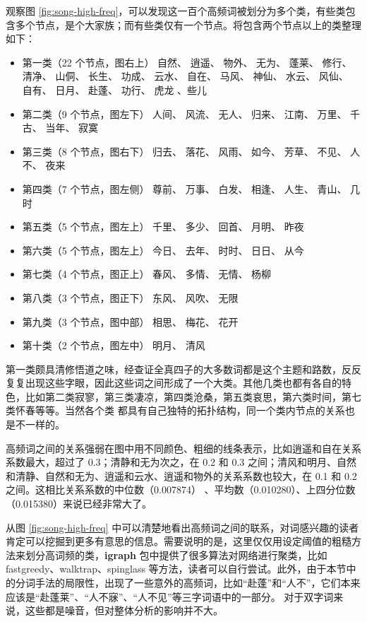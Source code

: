 \documentclass[
  b5paper,
  UTF8,twoside]{book}
\begin{document}
观察图 \ref{fig:song-high-freq}，可以发现这一百个高频词被划分为多个类，有些类包含多个节点，是个大家族；而有些类仅有一个节点。将包含两个节点以上的类整理如下：

\begin{itemize}
\item
  第一类（22 个节点，图右上） 自然、 逍遥、 物外、 无为、 蓬莱、 修行、 清净、 山侗、 长生、 功成、 云水、 自在、 马风、 神仙、 水云、 风仙、 自有、 日月、 赴蓬、 功行、 虎龙 、些儿
\item
  第二类（9 个节点，图左下） 人间、 风流、 无人、 归来、 江南、 万里、 千古、 当年、 寂寞
\item
  第三类（8 个节点，图右下） 归去、 落花、 风雨、 如今、 芳草、 不见、 人不、 夜来
\item
  第四类（7 个节点，图左侧） 尊前、 万事、 白发、 相逢、 人生、 青山、 几时
\item
  第五类（5 个节点，图左上） 千里、 多少、 回首、 月明、 昨夜
\item
  第六类（5 个节点，图左上） 今日、 去年、 时时、 日日、 从今
\item
  第七类（4 个节点，图正上） 春风、 多情、 无情、 杨柳
\item
  第八类（3 个节点，图正下） 东风、 风吹、 无限
\item
  第九类（3 个节点，图中部） 相思、 梅花、 花开
\item
  第十类（2 个节点，图左中） 明月、 清风
\end{itemize}

第一类颇具清修悟道之味，经查证全真四子的大多数词都是这个主题和路数，反反复复出现这些字眼，因此这些词之间形成了一个大类。其他几类也都有各自的特色，比如第二类寂寥，第三类凄凉，第四类沧桑，第五类哀思，第六类时间，第七类怀春等等。当然各个类 都具有自己独特的拓扑结构，同一个类内节点的关系也是不一样的。

高频词之间的关系强弱在图中用不同颜色、粗细的线条表示，比如逍遥和自在关系系数最大，超过了 0.3；清静和无为次之，在 0.2 和 0.3 之间；清风和明月、自然和清静、自然和无为、逍遥和云水、逍遥和物外的关系系数也较大，在 0.1 和 0.2 之间。这相比关系系数的中位数（0.007874） 、平均数（0.010280）、上四分位数（0.015380）来说已经非常大了。

从图 \ref{fig:song-high-freq} 中可以清楚地看出高频词之间的联系，对词感兴趣的读者肯定可以挖掘到更多有意思的信息。需要说明的是，这里仅仅用设定阈值的粗糙方法来划分高词频的类，\textbf{igraph} 包中提供了很多算法对网络进行聚类，比如 fastgreedy、walktrap、spinglass 等方法，读者可以自行尝试。此外，由于本节中的分词手法的局限性，出现了一些意外的高频词，比如``赴蓬''和``人不''，它们本来应该是``赴蓬莱''、``人不寐''、``人不见''等三字词语中的一部分。 对于双字词来说，这些都是噪音，但对整体分析的影响并不大。
\end{document}
